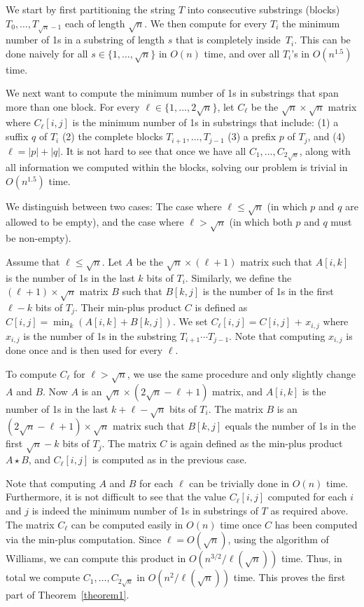 \documentclass[11pt]{llncs}
\begin{document}
We start by first partitioning the string $T$ into consecutive substrings (blocks) $T_0,\ldots, T_{\sqrt{n}-1}$ each of length $\sqrt{n}$. We then compute for every $T_i$ the minimum number of 1s in a substring of length $s$ that is completely inside~$T_i$. This can be done naively for all $s\in\{1,\ldots, \sqrt{n}\}$ in $O(n)$ time, and over all $T_i$'s in $O(n^{1.5})$ time.


We next want to compute the minimum number of 1s in substrings that span more than one block. For every $\ell \in \{1,\ldots, 2\sqrt{n}\}$, let $C_\ell$ be the $\sqrt{n}\times \sqrt{n}$  matrix where $C_\ell[i,j]$ is the minimum number of 1s in substrings that include: (1) a suffix $q$ of $T_i$ (2) the complete blocks $T_{i+1},\ldots,T_{j-1}$ (3) a prefix $p$ of $T_j$, and (4) $\ell=|p|+|q|$. It is not hard to see that once we have all $C_1,\ldots,C_{2\sqrt{n}}$, along with all information we computed within the blocks, solving our problem is trivial in $O(n^{1.5})$ time.

We distinguish between two cases: The case where $\ell \leq \sqrt{n}$ (in which $p$ and $q$ are allowed to be empty), and the case where $\ell > \sqrt{n}$ (in which both $p$ and $q$ must be non-empty).

Assume that $\ell \le \sqrt{n}$. Let $A$ be the  $\sqrt{n}\times (\ell+1)$ matrix such that $A[i,k]$ is the number of 1s in the last $k$ bits of $T_i$. Similarly, we define the $(\ell+1) \times \sqrt{n}$ matrix $B$ such that $B[k,j]$ is the number of 1s in the first $\ell-k$ bits of $T_j$. Their min-plus product $C$ is defined as $C[i,j] = \min_{k} (A[i,k] + B[k,j])$. We set $C_\ell[i,j] = C[i,j]$ + $x_{i,j}$ where $x_{i,j}$ is the number of 1s in the substring $T_{i+1} \cdots T_{j-1}$. Note that computing $x_{i,j}$ is done once and is then used for every $\ell$.

To compute $C_\ell$ for $\ell > \sqrt{n}$, we use the same procedure and only slightly change $A$ and $B$. Now $A$ is an  $\sqrt{n}\times (2\sqrt{n}-\ell+1)$ matrix, and $A[i,k]$ is the number of 1s in the last $k+\ell-\sqrt{n}$ bits of $T_i$. The matrix $B$ is an~$(2\sqrt{n}-\ell+1)\times \sqrt{n}$  matrix such that $B[k,j]$ equals the number of 1s in the first $\sqrt{n}-k$ bits of $T_j$. The matrix $C$ is again defined as the min-plus product $A \star B$, and $C_\ell[i,j]$ is computed as in the previous case.

Note that computing $A$ and $B$ for each $\ell$ can be trivially done in $O(n)$ time. Furthermore, it is not difficult to see that  the value $C_\ell[i,j]$ computed for each $i$ and $j$ is indeed the minimum number of 1s in substrings of $T$ as required above. The matrix $C_\ell$ can be computed easily in $O(n)$ time once $C$ has been computed via the min-plus computation. Since $\ell=O(\sqrt{n})$, using the algorithm of Williams, we can compute this product in $O(n^{3/2}/\ell(\sqrt{n}))$ time. Thus, in total we compute $C_1,\ldots,C_{2\sqrt{n}}$ in $O(n^2/\ell(\sqrt{n}))$ time. This proves the first part of Theorem~\ref{theorem1}.
\end{document}

